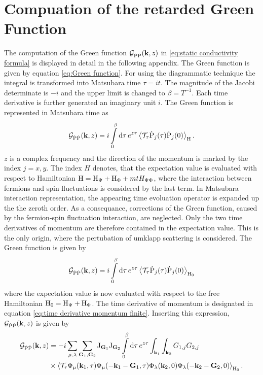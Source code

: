 %
%
\chapter{Compuation of the retarded Green Function}
\label{appch:green function}
%
%
The computation of the Green function $\mathcal{G}_{\dot{\mathrm{P}}\dot{\mathrm{P}}}(\vb{k}, z)$ in \eqref{eq:static conductivity formula} is displayed in detail in the following appendix.
The Green function is given by equation \eqref{eq:Green function}.
For using the diagrammatic technique the integral is transformed into Matsubara time $\tau = it$.
The magnitude of the Jacobi determinate is $-i$ and the upper limit is changed to $\beta = T^{-1}$.
Each time derivative is further generated an imaginary unit $i$.
The Green function is represented in Matsubara time as
%
\begin{align}
	\mathcal{G}_{\dot{\mathrm{P}}\dot{\mathrm{P}}}(\vb{k}, z) = i \int\limits_{0}^{\beta} \dd{\tau} e^{z \tau} \expval{\mathcal{T}_{\tau} \dot{\mathrm{P}}_{j}(\tau) \dot{\mathrm{P}}_{j}(0)}_{\mathrm{H}}.
\end{align}
%
$z$ is a complex frequency and the direction of the momentum is marked by the index $j = x,y$.
The index $H$ denotes, that the expectation value is evaluated with respect to Hamiltonian $\mathrm{H} = \mathrm{H}_{\Psi} + \mathrm{H}_{\Phi} + mt{H}_{\Psi\Phi}$, where the interaction between fermions and spin fluctuations is considered by the last term.
In Matsubara interaction representation, the appearing time evoluation operator is expanded up the the zeroth order.
As a consequance, corrections of the Green function, caused by the fermion-spin fluctuation interaction, are neglected.
Only the two time derivatives of momentum are therefore contained in the expectation value.
This is the only origin, where the pertubation of umklapp scattering is considered.
The Green function is given by
%
\begin{align}
	\mathcal{G}_{\dot{\mathrm{P}}\dot{\mathrm{P}}}(\vb{k}, z) = i \int\limits_{0}^{\beta} \dd{\tau} e^{z \tau} \expval{\mathcal{T}_{\tau} \dot{\mathrm{P}}_{j}(\tau) \dot{\mathrm{P}}_{j}(0)}_{\mathrm{H}_{0}}
\end{align}
%
where the expectation value is now evaluated with respect to the free Hamiltonian $\mathrm{H}_{0} = \mathrm{H}_{\Psi} + \mathrm{H}_{\Phi}$.
The time derivative of momentum is designated in equation \eqref{eq:time derivative momentum finite}.
Inserting this expression, $\mathcal{G}_{\dot{\mathrm{P}}\dot{\mathrm{P}}}(\vb{k}, z)$ is given by
%
\begin{align}
	\mathcal{G}_{\dot{\mathrm{P}}\dot{\mathrm{P}}}(\vb{k}, z) &= 
		-i 
		\sum\limits_{\mu, \lambda}
		\sum\limits_{\vb{G}_{1}, \vb{G}_{2}} 
		\mathrm{J}_{\vb{G}_{1}} \mathrm{J}_{\vb{G}_{2}} 
		\int\limits_{0}^{\beta} \dd{\tau} e^{z \tau} 
		\int_{\vb{k}_{1}}\int_{\vb{k}_{2}} G_{1,j}  G_{2,j} 
		\notag \\
		&\times
		\expval{\mathcal{T}_{\tau} \Phi_{\mu}(\vb{k}_{1},\tau) \Phi_{\mu}(-\vb{k}_{1} - \vb{G}_{1},\tau) \Phi_{\lambda}(\vb{k}_{2},0) \Phi_{\lambda}(-\vb{k}_{2} - \vb{G}_{2},0)}_{\mathrm{H}_{0}}.
\end{align}
